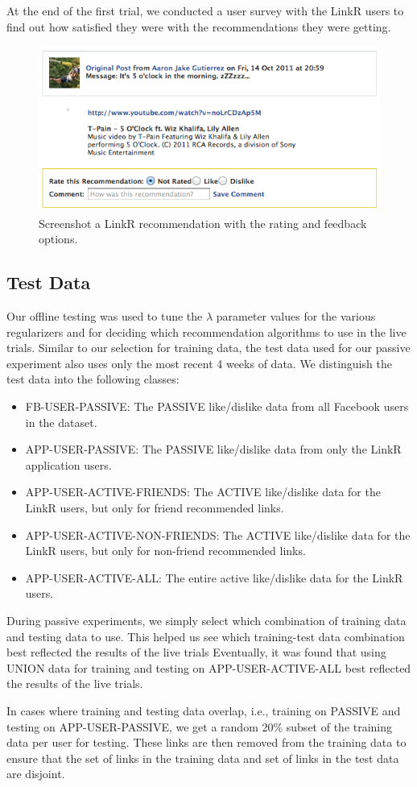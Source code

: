 At the end of the first trial, we conducted a user survey with the LinkR users to find out how satisfied they were with the recommendations they were getting.

\begin{figure}
\centering
\includegraphics[scale=0.5]{linkr_rating.png}
\caption{Screenshot a LinkR recommendation with the rating and feedback options.}
 \end{figure}
 
\subsection{Test Data}

Our offline testing was used to tune the $\lambda$ parameter values for the various regularizers and for deciding which recommendation algorithms to use in the live trials. Similar to our selection for training data, the test data used for our passive experiment also uses only the most recent 4 weeks of data. We distinguish the test data into the following classes:

\begin{itemize}
\item{FB-USER-PASSIVE: The PASSIVE like/dislike data from all Facebook users in the dataset.}
\item{APP-USER-PASSIVE: The PASSIVE like/dislike data from only the LinkR application users.}
\item{APP-USER-ACTIVE-FRIENDS: The ACTIVE like/dislike data for the LinkR users, but only for friend recommended links.}
\item{APP-USER-ACTIVE-NON-FRIENDS: The ACTIVE like/dislike data for the LinkR users, but only for non-friend recommended links.}
\item{APP-USER-ACTIVE-ALL: The entire active like/dislike data for the LinkR users.}
\end{itemize}

During passive experiments, we simply select which combination of training data and testing data to use. This helped us see which training-test data combination best reflected the results of the live trials Eventually, it was found that using UNION data for training and testing on APP-USER-ACTIVE-ALL best reflected the results of the live trials. 

In cases where training and testing data overlap, i.e., training on PASSIVE and testing on APP-USER-PASSIVE, we get a random 20\% subset of the training data per user for testing. These links are then removed from the training data to ensure that the set of links in the training data and set of links in the test data are disjoint.
